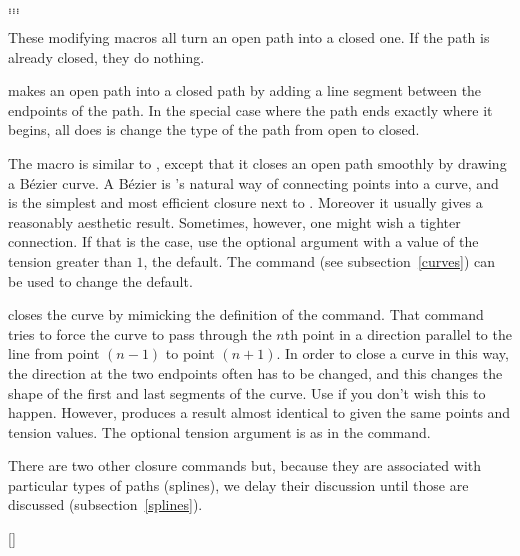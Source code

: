 \documentclass[letterpaper]{article}
\begin{document}
\begin{cd}
$\ldots$\\
$\ldots$\\
$\ldots$%
%
\end{cd}

These modifying macros all turn an open path into a closed one. If the
path is already closed, they do nothing.

 makes an open path into a closed path by adding a line
segment between the endpoints of the path. In the special case where
the path ends exactly where it begins, all  does is change
the type of the path from open to closed.

The  macro is similar to , except that it closes
an open path smoothly by drawing a B\'ezier curve. A B\'ezier is \MF{}'s
natural way of connecting points into a curve, and  is the
simplest and most efficient closure next to . Moreover it
usually gives a reasonably aesthetic result. Sometimes, however, one
might wish a tighter connection. If that is the case, use the optional
argument with a value of the tension  greater than $1$, the
default. The command  (see subsection~\ref{curves}) can
be used to change the default.

 closes the curve by mimicking the definition of the
 command. That command tries to force the curve to pass
through the $n$th point in a direction parallel to the line from point
$(n-1)$ to point $(n+1)$. In order to close a curve in this way, the
direction at the two endpoints often has to be changed, and this changes
the shape of the first and last segments of the curve. Use 
if you don't wish this to happen. However, 
produces a result almost identical to  given the same points
and tension values. The optional tension argument is as in the
 command.

There are two other closure commands but, because they are associated
with particular types of paths (splines), we delay their discussion
until those are discussed (subsection~\ref{splines}).

\begin{cd}
[]%
\end{cd}
\end{document}
